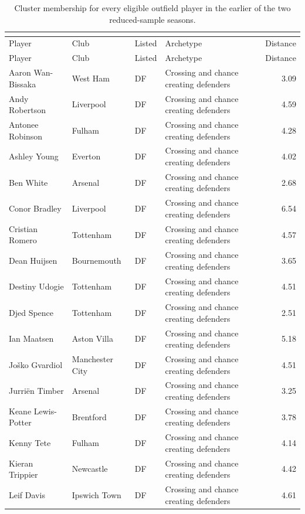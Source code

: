 \small
\begin{longtable}{p{3.4cm}p{2.5cm}p{1.0cm}p{5.0cm}r}
\caption{Cluster membership for every eligible outfield player in the earlier of the two reduced-sample seasons.}\\
\label{tab:membership}\\
\toprule
Player & Club & Listed & Archetype & Distance \\
\midrule
\endfirsthead
\toprule
Player & Club & Listed & Archetype & Distance \\
\midrule
\endhead
Aaron Wan-Bissaka & West Ham & DF & Crossing and chance creating defenders & 3.09 \\
Andy Robertson & Liverpool & DF & Crossing and chance creating defenders & 4.59 \\
Antonee Robinson & Fulham & DF & Crossing and chance creating defenders & 4.28 \\
Ashley Young & Everton & DF & Crossing and chance creating defenders & 4.02 \\
Ben White & Arsenal & DF & Crossing and chance creating defenders & 2.68 \\
Conor Bradley & Liverpool & DF & Crossing and chance creating defenders & 6.54 \\
Cristian Romero & Tottenham & DF & Crossing and chance creating defenders & 4.57 \\
Dean Huijsen & Bournemouth & DF & Crossing and chance creating defenders & 3.65 \\
Destiny Udogie & Tottenham & DF & Crossing and chance creating defenders & 4.51 \\
Djed Spence & Tottenham & DF & Crossing and chance creating defenders & 2.51 \\
Ian Maatsen & Aston Villa & DF & Crossing and chance creating defenders & 5.18 \\
Joško Gvardiol & Manchester City & DF & Crossing and chance creating defenders & 4.51 \\
Jurriën Timber & Arsenal & DF & Crossing and chance creating defenders & 3.25 \\
Keane Lewis-Potter & Brentford & DF & Crossing and chance creating defenders & 3.78 \\
Kenny Tete & Fulham & DF & Crossing and chance creating defenders & 4.14 \\
Kieran Trippier & Newcastle & DF & Crossing and chance creating defenders & 4.42 \\
Leif Davis & Ipswich Town & DF & Crossing and chance creating defenders & 4.61 \\

\end{longtable}
